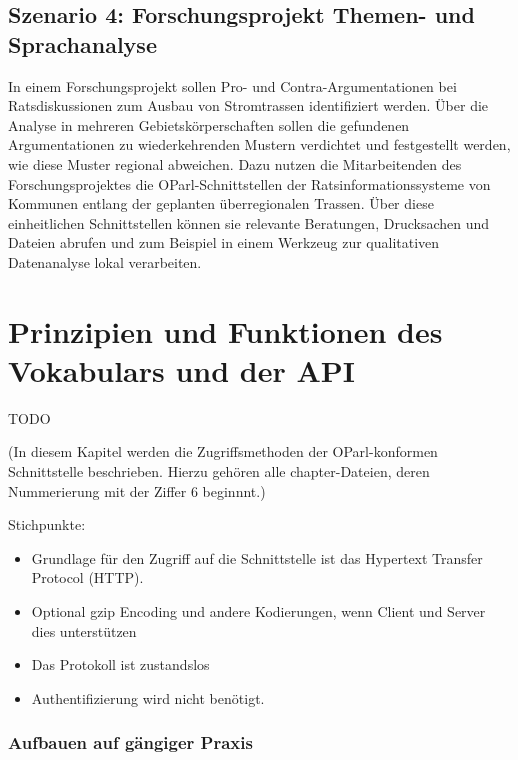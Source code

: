 \documentclass[,a4paper]{article}
\begin{document}
\subsection{Szenario 4: Forschungsprojekt Themen- und
Sprachanalyse}\label{szenarioux5fforschung}

In einem Forschungsprojekt sollen Pro- und Contra-Argumentationen bei
Ratsdiskussionen zum Ausbau von Stromtrassen identifiziert werden. Über
die Analyse in mehreren Gebietskörperschaften sollen die gefundenen
Argumentationen zu wiederkehrenden Mustern verdichtet und festgestellt
werden, wie diese Muster regional abweichen. Dazu nutzen die
Mitarbeitenden des Forschungsprojektes die OParl-Schnittstellen der
Ratsinformationssysteme von Kommunen entlang der geplanten
überregionalen Trassen. Über diese einheitlichen Schnittstellen können
sie relevante Beratungen, Drucksachen und Dateien abrufen und zum
Beispiel in einem Werkzeug zur qualitativen Datenanalyse lokal
verarbeiten.

\section{Prinzipien und Funktionen des Vokabulars und der
API}\label{prinzipien-und-funktionen-des-vokabulars-und-der-api}

TODO

(In diesem Kapitel werden die Zugriffsmethoden der OParl-konformen
Schnittstelle beschrieben. Hierzu gehören alle chapter-Dateien, deren
Nummerierung mit der Ziffer 6 beginnnt.)

Stichpunkte:

\begin{itemize}
\itemsep1pt\parskip0pt
\item
  Grundlage für den Zugriff auf die Schnittstelle ist das Hypertext
  Transfer Protocol (HTTP).
\item
  Optional gzip Encoding und andere Kodierungen, wenn Client und Server
  dies unterstützen
\item
  Das Protokoll ist zustandslos
\item
  Authentifizierung wird nicht benötigt.
\end{itemize}


\subsubsection{Aufbauen auf gängiger
Praxis}\label{aufbauen-auf-guxe4ngiger-praxis}
\end{document}
